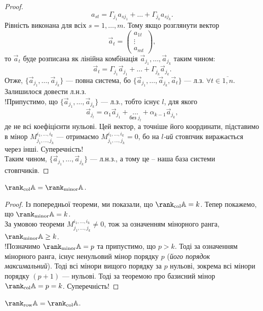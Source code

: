 \documentclass{math_library}
\begin{document}
\begin{proof}
\[
a_{st} = \Gamma_{j_1} a_{sj_1} + \dots + \Gamma_{j_k} a_{sj_k}.
\] 
Рівність виконана для всіх $s = 1,\dots,m$. Тому якщо розглянути вектор 
\[
\vec{a}_t = \begin{pmatrix}
a_{1t} \\ \vdots \\ a_{mt}
\end{pmatrix},
\]
то $\vec{a}_t$ буде розписана як лінійна комбінація $\vec{a}_{j_1},\dots,\vec{a}_{j_k}$ таким чином:
\[
\vec{a}_t = \Gamma_{j_1} \vec{a}_{j_1} + \dots + \Gamma_{j_k} \vec{a}_{j_k}.
\]
Отже, $\{\vec{a}_{j_1},\dots,\vec{a}_{j_k}\}$ --- повна система, бо $\{\vec{a}_{j_1},\dots,\vec{a}_{j_k}, \vec{a}_t\}$ --- л.з. $\forall t \in \overline{1,n}$. Залишилося довести л.н.з.\\
!Припустимо, що $\{\vec{a}_{j_1},\dots,\vec{a}_{j_k}\}$ --- л.з., тобто існує $l$, для якого 
\[
\vec{a}_{j_l} = \alpha_1 \vec{a}_{j_1} + \underset{\text{без }j_l}{\dots} + \alpha_{k-1} \vec{a}_{j_k},
\]
де не всі коефіцієнти нульові. Цей вектор, а точніше його координати, підставимо в мінор $M_{j_1,\dots,j_k}^{i_1,\dots,i_k}$ --- отримаємо $M_{j_1,\dots,j_k}^{i_1,\dots,i_k} = 0$, бо на $l$\textit{-ий} стовпчик виражається через інші. Суперечність!\\
Таким чином, $\{\vec{a}_{j_1},\dots,\vec{a}_{j_k}\}$ --- л.н.з., а тому це -- наша база системи стовпчиків.
\end{proof}

\begin{corollary}
$\rank_{\text{col}} \mathbb{A} = \rank_{\text{minor}} \mathbb{A}$.
\end{corollary}

\begin{proof}
Із попередньої теореми, ми показали, що $\rank_{\text{col}} \mathbb{A} = k$. Тепер покажемо, що $\rank_{\text{minor}} \mathbb{A} = k$.\\
За умовою теореми $M_{j_1,\dots,j_k}^{i_1,\dots,i_k} \neq 0$, тож за означенням мінорного ранга, $\rank_{\text{minor}} \mathbb{A} \geq k$.\\
!Позначимо $\rank_{\text{minor}} \mathbb{A} = p$ та припустимо, що $p > k$. Тоді за означенням мінорного ранга, існує ненульовий мінор порядку $p$ (\textit{його порядок максимальний}). Тоді всі мінори вищого порядку за $p$ нульові, зокрема всі мінори порядку $(p+1)$ --- нульові. Тоді за теоремою про базисний мінор $\rank_{\text{col}} \mathbb{A} = p = k$. Суперечність!
\end{proof}

\begin{corollary}
$\rank_{\textrm{row}} \mathbb{A} = \rank_{\textrm{col}} \mathbb{A}$.
\end{corollary}
\end{document}
